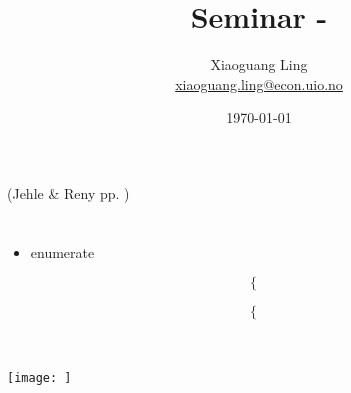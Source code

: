 \documentclass{article}
\title{Seminar  - }
\author{Xiaoguang Ling \\  \href{xiaoguang.ling@econ.uio.no}{xiaoguang.ling@econ.uio.no}}
\date{\today}
\begin{document}
 
\maketitle

(Jehle \& Reny pp. )
\section{}

\begin{mdframed}[backgroundcolor=blue!20,linecolor=white]

\end{mdframed}


\begin{mdframed}[backgroundcolor=yellow!20,linecolor=white]

\end{mdframed}




\begin{itemize}
\item enumerate
\end{itemize}


\begin{equation}
    \begin{cases}

    \end{cases}
    \label{eq:}   
\end{equation}


\begin{equation}
    \begin{cases}

    \end{cases}
\nonumber
\end{equation}


\begin{align*}


\end{align*}





\subsection{}

{\centering
\texttt{[image: ]}
\label{}}
\vspace{2mm}
\end{document}
